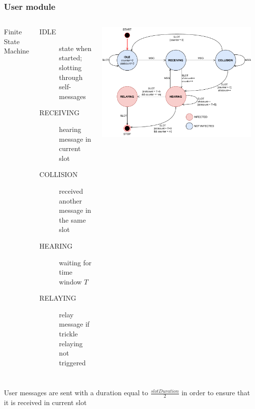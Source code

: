 \documentclass[aspectratio=169]{beamer}
\begin{document}
\begin{frame}
	\frametitle{User module}
	\begin{columns}
		Finite State Machine
		\begin{description}
			\item[IDLE] state when started; slotting through
				self-messages
			\item[RECEIVING] hearing message in current slot
			\item[COLLISION] received another message in the same
				slot
			\item[HEARING] waiting for time window \(T\)
			\item[RELAYING] relay message if trickle relaying not
				triggered
		\end{description}
		\includegraphics[width=\textwidth]{img/userfsm}
	\end{columns}
	User messages are sent with a duration equal to
	\(\frac{slotDuration}{2}\) in order to ensure that it is
	received in current slot
\end{frame}
\end{document}

